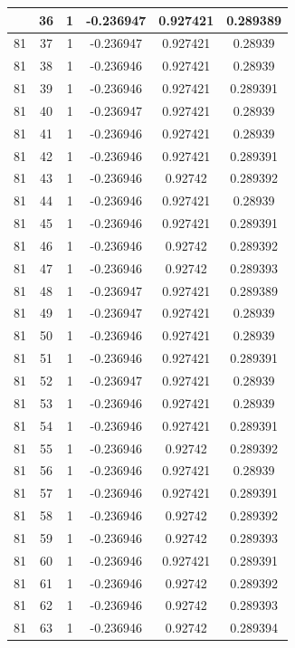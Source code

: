 \documentclass[12pt,a4paper]{article}
\numberwithin{equation}{section}
\numberwithin{figure}{section}
\numberwithin{table}{section}
\begin{document}
\begin{longtable}{|c|c|c|c|c|c|}
\pagebreak
81 & 36 & 1 & -0.236947 & 0.927421 & 0.289389 \\ \hline
81 & 37 & 1 & -0.236947 & 0.927421 & 0.28939 \\ \hline
81 & 38 & 1 & -0.236946 & 0.927421 & 0.28939 \\ \hline
81 & 39 & 1 & -0.236946 & 0.927421 & 0.289391 \\ \hline
81 & 40 & 1 & -0.236947 & 0.927421 & 0.28939 \\ \hline
81 & 41 & 1 & -0.236946 & 0.927421 & 0.28939 \\ \hline
81 & 42 & 1 & -0.236946 & 0.927421 & 0.289391 \\ \hline
81 & 43 & 1 & -0.236946 & 0.92742 & 0.289392 \\ \hline
81 & 44 & 1 & -0.236946 & 0.927421 & 0.28939 \\ \hline
81 & 45 & 1 & -0.236946 & 0.927421 & 0.289391 \\ \hline
81 & 46 & 1 & -0.236946 & 0.92742 & 0.289392 \\ \hline
81 & 47 & 1 & -0.236946 & 0.92742 & 0.289393 \\ \hline
81 & 48 & 1 & -0.236947 & 0.927421 & 0.289389 \\ \hline
81 & 49 & 1 & -0.236947 & 0.927421 & 0.28939 \\ \hline
81 & 50 & 1 & -0.236946 & 0.927421 & 0.28939 \\ \hline
81 & 51 & 1 & -0.236946 & 0.927421 & 0.289391 \\ \hline
81 & 52 & 1 & -0.236947 & 0.927421 & 0.28939 \\ \hline
81 & 53 & 1 & -0.236946 & 0.927421 & 0.28939 \\ \hline
81 & 54 & 1 & -0.236946 & 0.927421 & 0.289391 \\ \hline
81 & 55 & 1 & -0.236946 & 0.92742 & 0.289392 \\ \hline
81 & 56 & 1 & -0.236946 & 0.927421 & 0.28939 \\ \hline
81 & 57 & 1 & -0.236946 & 0.927421 & 0.289391 \\ \hline
81 & 58 & 1 & -0.236946 & 0.92742 & 0.289392 \\ \hline
81 & 59 & 1 & -0.236946 & 0.92742 & 0.289393 \\ \hline
81 & 60 & 1 & -0.236946 & 0.927421 & 0.289391 \\ \hline
81 & 61 & 1 & -0.236946 & 0.92742 & 0.289392 \\ \hline
81 & 62 & 1 & -0.236946 & 0.92742 & 0.289393 \\ \hline
81 & 63 & 1 & -0.236946 & 0.92742 & 0.289394 \\ \hline

\end{longtable}
\end{document}
